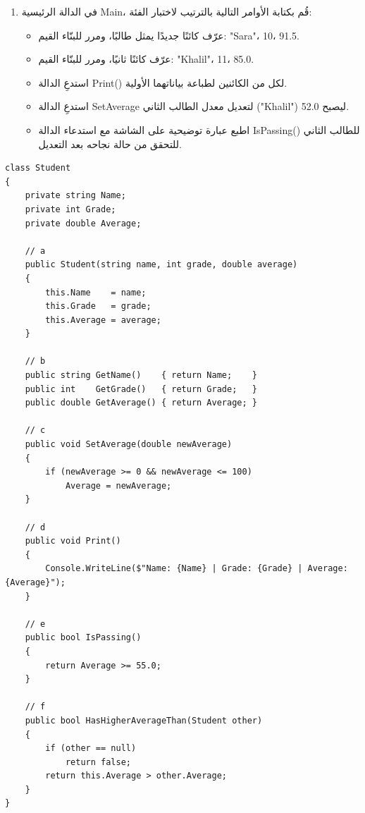 \documentclass[14pt]{extarticle}
\begin{document}
\begin{enumerate}[itemsep=2em]
\begin{enumerate}[itemsep=1em]
    \item في الدالة الرئيسية \textenglish{Main}، قُم بكتابة الأوامر التالية بالترتيب لاختبار الفئة:
    \begin{itemize}[itemsep=1pt]
        \item عرّف كائنًا جديدًا يمثل طالبًا، ومرر للبنّاء القيم: \textenglish{"Sara"}، \textenglish{10}، \textenglish{91.5}.
        \item عرّف كائنًا ثانيًا، ومرر للبنّاء القيم: \textenglish{"Khalil"}، \textenglish{11}، \textenglish{85.0}.
        \item استدعِ الدالة \textenglish{Print()} لكل من الكائنين لطباعة بياناتهما الأولية.
        \item استدعِ الدالة \textenglish{SetAverage} لتعديل معدل الطالب الثاني (\textenglish{"Khalil"}) ليصبح \textenglish{52.0}.
        \item اطبع عبارة توضيحية على الشاشة مع استدعاء الدالة \textenglish{IsPassing()} للطالب الثاني للتحقق من حالة نجاحه بعد التعديل.
    \end{itemize}
\end{enumerate}

\ifwithsols
\begin{boxSolution}
\begin{english}
\begin{verbatim}
class Student
{
    private string Name;
    private int Grade;
    private double Average;

    // a
    public Student(string name, int grade, double average)
    {
        this.Name    = name;
        this.Grade   = grade;
        this.Average = average;
    }

    // b
    public string GetName()    { return Name;    }
    public int    GetGrade()   { return Grade;   }
    public double GetAverage() { return Average; }

    // c
    public void SetAverage(double newAverage)
    {
        if (newAverage >= 0 && newAverage <= 100)
            Average = newAverage;
    }

    // d
    public void Print()
    {
        Console.WriteLine($"Name: {Name} | Grade: {Grade} | Average: {Average}");
    }

    // e
    public bool IsPassing()
    {
        return Average >= 55.0;
    }

    // f
    public bool HasHigherAverageThan(Student other)
    {
        if (other == null)
            return false;
        return this.Average > other.Average;
    }
}


\end{verbatim}
\end{english}
\end{boxSolution}
\end{enumerate}
\end{document}
